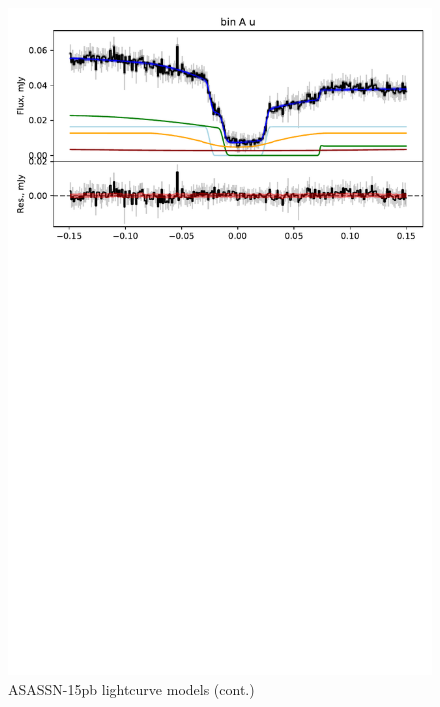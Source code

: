 \begin{figure}
    \centering
    \includegraphics[width=\textwidth]{figures/results/ASASSN-15pb/ASASSN-15pb_2.pdf}
    \caption{ASASSN-15pb lightcurve models (cont.)}
    \label{fig:ASASSN-15pb all lightcurves cont 1}
\end{figure}




